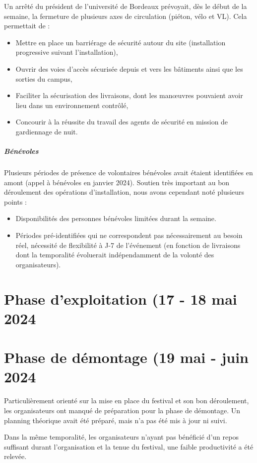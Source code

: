 \documentclass[12pt,a4paper]{report}
\begin{document}
Un arrêté du président de l'université de Bordeaux prévoyait, dès le début de la semaine, la fermeture de plusieurs axes de circulation (piéton, vélo et VL). Cela permettait de :
\begin{itemize}
\item Mettre en place un barriérage de sécurité autour du site (installation progressive suivant l'installation),
\item Ouvrir des voies d'accès sécurisée depuis et vers les bâtiments ainsi que les sorties du campus,
\item Faciliter la sécurisation des livraisons, dont les manœuvres pouvaient avoir lieu dans un environnement contrôlé,
\item Concourir à la réussite du travail des agents de sécurité en mission de gardiennage de nuit.
\end{itemize}

\subparagraph{Bénévoles}
Plusieurs périodes de présence de volontaires bénévoles avait étaient identifiées en amont (appel à bénévoles en janvier 2024). Soutien très important au bon déroulement des opérations d'installation, nous avons cependant noté plusieurs points : 
\begin{itemize}
\item Disponibilités des personnes bénévoles limitées durant la semaine.
\item Périodes pré-identifiées qui ne correspondent pas nécessairement au besoin réel, nécessité de flexibilité à J-7 de l'événement (en fonction de livraisons dont la temporalité évoluerait indépendamment de la volonté des organisateurs).
\end{itemize}

\section{Phase d'exploitation (17 - 18 mai 2024}

\section{Phase de démontage (19 mai - juin 2024}
Particulièrement orienté sur la mise en place du festival et son bon déroulement, les organisateurs ont manqué de préparation pour la phase de démontage. Un planning théorique avait été préparé, mais n'a pas été mis à jour ni suivi.

Dans la même temporalité, les organisateurs n'ayant pas bénéficié d'un repos suffisant durant l'organisation et la tenue du festival, une faible productivité a été relevée.
\end{document}
